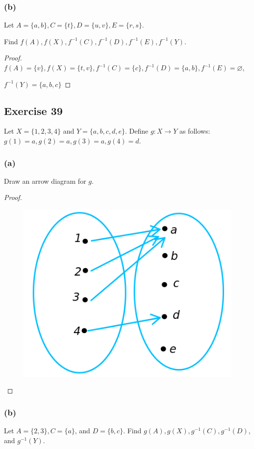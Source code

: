\documentclass[14pt]{extarticle}
\newcommand{\es}{\varnothing}
\begin{document}
\subsubsection{(b)}
Let \(A = \{a, b\}, C = \{t\}, D = \{u, v\}, E = \{r, s\}\). 

Find \(f(A), f(X), f^{-1}(C), f^{-1}(D), f^{-1}(E), f^{-1}(Y)\).

\begin{proof}
\(f(A) = \{v\}, f(X) = \{t, v\}, f^{-1}(C) = \{c\}, f^{-1}(D) = \{a, b\}, f^{-1}(E) = \es\), 

\(f^{-1}(Y) = \{a,b,c\}\)
\end{proof}

\subsection{Exercise 39}
Let \(X = \{1, 2, 3, 4\}\) and \(Y = \{a, b, c, d, e\}\). Define \(g: X \to Y\) as follows: 
\(g(1) = a, g(2) = a, g(3) = a, g(4) = d\).

\subsubsection{(a)}
Draw an arrow diagram for $g$.

\begin{proof}
\begin{figure}[ht!]
\centering
\includegraphics[scale=0.3]{../images/7.1.39.a.png}
\end{figure}
\end{proof}

\subsubsection{(b)}
Let \(A = \{2, 3\}, C = \{a\}\), and \(D = \{b, c\}\). Find \(g(A), g(X), g^{-1}(C), g^{-1}(D)\), and \(g^{-1}(Y)\).
\end{document}

